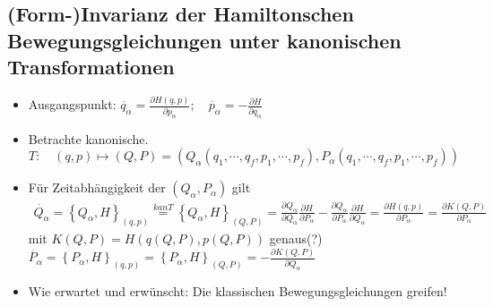 \subsection{(Form-)Invarianz der Hamiltonschen Bewegungsgleichungen unter kanonischen Transformationen}
\begin{itemize}
\item Ausgangspunkt:
  $\dot{q_{\alpha}} = \frac{\partial H(q,p)}{\partial
    p_{\alpha}};\quad \dot{p_{\alpha}} = - \frac{\partial H}{\partial
    q_{\alpha}}$
\item Betrachte kanonische.
  $T:\quad (q,p) \mapsto (Q,P) = \left(
    Q_{\alpha}(q_1,\cdots,q_f,p_1,\cdots,p_f ),
    P_{\alpha}(q_1,\cdots,q_f,p_1,\cdots,p_f) \right)$
\item Für Zeitabhängigkeit der $\left( Q_{\alpha}, P_{\alpha} \right)$
  gilt
  \begin{align*}
  \dot{Q_{\alpha}} = \left\{ Q_{\alpha}, H \right\}_{(q,p)} \stackrel{kanT}{=} \left\{ Q_{\alpha}, H \right\}_{(Q,P)} = \frac{\partial Q_{\alpha}}{\partial Q_{\alpha}}\frac{\partial H}{\partial P_{\alpha}} - \frac{\partial Q_{\alpha}}{\partial P_{\alpha}}\frac{\partial H}{\partial Q_{\alpha}} = \frac{\partial H(q,p)}{\partial P_{\alpha}} = \frac{\partial K(Q,P)}{\partial P_{\alpha}}
\end{align*}
mit $K(Q,P) = H(q(Q,P),p(Q,P))$ genaus(?)
$\dot{P_{\alpha}} = \left\{ P_{\alpha}, H \right\}_{(q,p)} = \left\{
  P_{\alpha},H \right\}_{(Q,P)} = - \frac{\partial K(Q,P)}{\partial
  Q_{\alpha}}$
\item Wie erwartet und erwünscht: Die klassischen Bewegungsgleichungen
  greifen!
\end{itemize}


